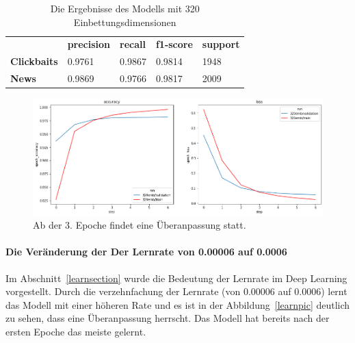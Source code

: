 \begin{table}[h]
    \caption{Die Ergebnisse des Modells mit 320 Einbettungsdimensionen}
    \label{eval32}
    \renewcommand{\arraystretch}{1.2}
    \centering
    \sffamily
    \begin{footnotesize}
        \begin{tabular}{l l l l l}
            \toprule
                           & \textbf{precision} & \textbf{recall} & \textbf{f1-score} & \textbf{support} \\
            \textbf{Clickbaits} & 0.9761                  & 0.9867                 & 0.9814                & 1948          \\
            \textbf{News}  & 0.9869                 & 0.9766                & 0.9817               & 2009                     \\
            \bottomrule
        \end{tabular}
    \end{footnotesize}
    \rmfamily
\end{table}

\begin{figure}[H]
    \centering
    \includegraphics[width=15cm]{kapitel5/320embd.png}
    \caption[Auswirkung der Einbettungsdimensionen]{Ab der 3. Epoche findet eine Überanpassung statt.}
    \label{32embdpic}
\end{figure}

\paragraph{Die Veränderung der Der Lernrate von 0.00006 auf 0.0006}
Im Abschnitt~\ref{learnsection} wurde die Bedeutung der Lernrate im Deep Learning vorgestellt. Durch die verzehnfachung der Lernrate (von 0.00006 auf 0.0006) lernt das Modell mit einer höheren Rate und es ist in der Abbildung~\ref{learnpic} deutlich zu sehen, dass eine Überanpassung herrscht. Das Modell hat bereits nach der ersten Epoche das meiste gelernt.

